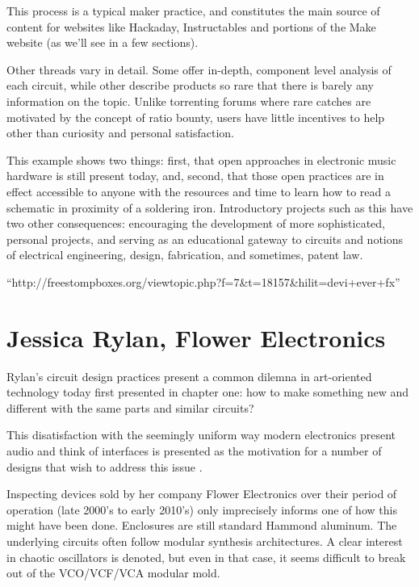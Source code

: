 This process is a typical maker practice, and constitutes the main source of content for websites like Hackaday, Instructables and portions of the Make website (as we'll see in a few sections). 

Other threads vary in detail. Some offer in-depth, component level analysis of each circuit, while other describe products so rare that there is barely any information on the topic. Unlike torrenting forums where rare catches are motivated by the concept of ratio bounty, users have little incentives to help other than curiosity and personal satisfaction. 


This example shows two things: first, that open approaches in electronic music hardware is still present today, and, second, that those open practices are in effect accessible to anyone with the resources and time to learn how to read a schematic in proximity of a soldering iron. Introductory projects such as this have two other consequences: encouraging the development of more sophisticated, personal projects, and serving as an educational gateway to circuits and notions of electrical engineering, design, fabrication, and sometimes, patent law. 

``http://freestompboxes.org/viewtopic.php?f=7&t=18157&hilit=devi+ever+fx''

\section{Jessica Rylan, Flower Electronics}

Rylan's circuit design practices present a common dilemna in art-oriented technology today first presented in chapter one: how to make something new and different with the same parts and similar circuits? 

This disatisfaction with the seemingly uniform way modern electronics present audio and think of interfaces is presented as the motivation for a number of designs that wish to address this issue \citep[pp.139-155]{rodgers2010}. 

Inspecting devices sold by her company Flower Electronics over their period of operation (late 2000's to early 2010's) only imprecisely informs one of how this might have been done. Enclosures are still standard Hammond aluminum. The underlying circuits often follow modular synthesis architectures. A clear interest in chaotic oscillators is denoted, but even in that case, it seems difficult to break out of the VCO/VCF/VCA modular mold. 

